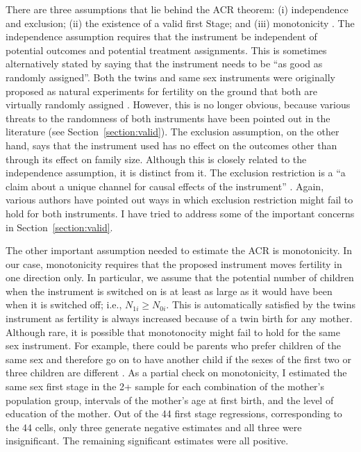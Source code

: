 There are three assumptions that lie behind the ACR theorem: (i) independence and exclusion; (ii) the existence of a valid first Stage; and (iii) monotonicity \parencite{Angrist2009}. The independence assumption requires that the instrument be independent of potential outcomes and potential treatment assignments. This is sometimes alternatively stated by saying that the instrument needs to be \enquote{as good as randomly assigned}. Both the twins and same sex instruments were originally proposed as natural experiments for fertility on the ground that both are virtually randomly assigned \parencite{rosenzweig_testing_1980,angrist_children_1998}. However, this is no longer obvious, because various threats to the randomness of both instruments have been pointed out in the literature (see Section~\ref{section:valid}). The exclusion assumption, on the other hand, says that the instrument used has no effect on the outcomes other than through its effect on family size.  Although this is closely related to the independence assumption, it is distinct from it. The exclusion restriction is a \enquote{a claim about a unique channel for causal effects of the instrument} \parencite[p.~153]{Angrist2009}. Again, various authors have pointed out ways in which exclusion restriction might fail to hold for both instruments. I have tried to address some of the important concerns in Section~\ref{section:valid}.

The other important assumption needed to estimate the ACR is monotonicity. In our case, monotonicity requires that the proposed instrument moves fertility in one direction only. In particular, we assume that the potential number of children when the instrument is switched on is at least as large as it would have been when it is switched off; i.e., $ N_{1i} \geq N_{0i} $. This is automatically satisfied by the twins instrument as fertility is always increased because of a twin birth for any mother. Although rare, it is possible that monotonocity might fail to hold for the same sex instrument. For example, there could be parents who prefer children of the same sex and therefore go on to have another child if the sexes of the first two or three children are different \parencite{Huber2015}. As a partial check on monotonicity, I estimated the same sex first stage in the 2+ sample for each combination of the mother's population group, intervals of the mother's age at first birth, and the level of education of the mother. Out of the 44 first stage regressions, corresponding to the 44 cells, only three generate negative estimates and all three were insignificant. The remaining significant estimates were all positive.

